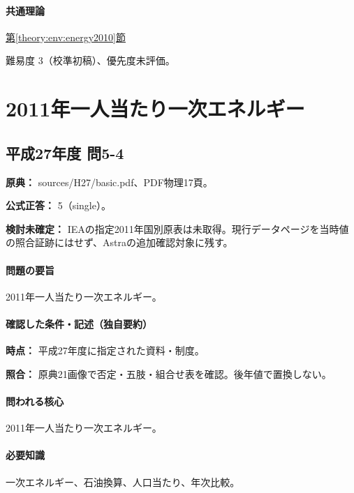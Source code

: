\paragraph{共通理論} \hyperref[theory:env:energy2010]{第\ref*{theory:env:energy2010}節}

\par 難易度 3（校準初稿）、優先度未評価。

\section{2011年一人当たり一次エネルギー}

\subsection{平成27年度 問5-4}
\label{q:h27-reg-basic-5-4}

\noindent\textbf{原典：} sources/H27/basic.pdf、PDF物理17頁。

\textbf{公式正答：} 5（single）。

\par\textbf{検討未確定：} IEAの指定2011年国別原表は未取得。現行データページを当時値の照合証跡にはせず、Astraの追加確認対象に残す。

\paragraph{問題の要旨} 2011年一人当たり一次エネルギー。

\paragraph{確認した条件・記述（独自要約）}\mbox{}\par

\noindent\textbf{時点：} 平成27年度に指定された資料・制度。\par

\noindent\textbf{照合：} 原典21画像で否定・五肢・組合せ表を確認。後年値で置換しない。\par

\paragraph{問われる核心} 2011年一人当たり一次エネルギー。

\paragraph{必要知識} 一次エネルギー、石油換算、人口当たり、年次比較。

